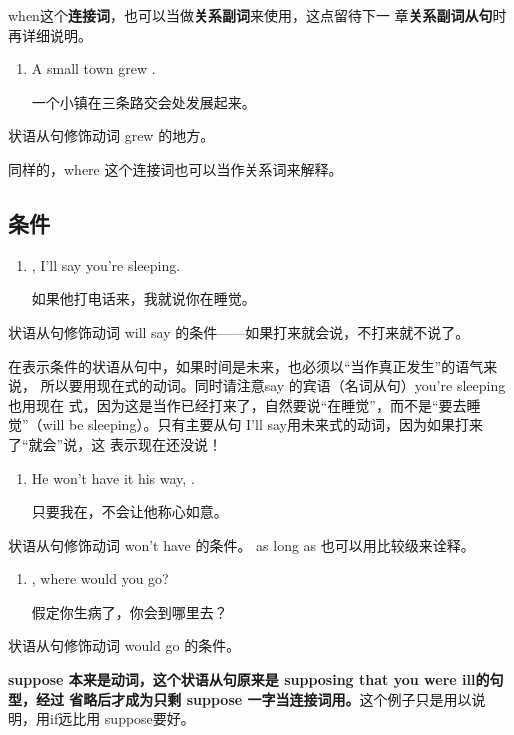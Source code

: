 when这个\textbf{连接词}，也可以当做\textbf{关系副词}来使用，这点留待下一
章\textbf{关系副词从句}时再详细说明。

\begin{enumerate}[resume]
\item A small town grew  .

  一个小镇在三条路交会处发展起来。
\end{enumerate}
状语从句修饰动词 grew 的地方。

同样的，where 这个连接词也可以当作关系词来解释。

\subsection{条件}

\begin{enumerate}
\item {} , I'll say you're
  sleeping.

  如果他打电话来，我就说你在睡觉。
\end{enumerate}
状语从句修饰动词 will say 的条件——如果打来就会说，不打来就不说了。

在表示条件的状语从句中，如果时间是未来，也必须以“当作真正发生”的语气来说，
所以要用现在式的动词。同时请注意say 的宾语（名词从句）you're sleeping也用现在
式，因为这是当作已经打来了，自然要说“在睡觉”，而不是“要去睡觉”（will be
sleeping）。只有主要从句 I'll say用未来式的动词，因为如果打来了“就会”说，这
表示现在还没说！

\begin{enumerate}[resume]
\item He won't have it his way,  .

  只要我在，不会让他称心如意。
\end{enumerate}
状语从句修饰动词 won't have 的条件。 as long as 也可以用比较级来诠释。

\begin{enumerate}[resume]
\item {} , where would you go?

  假定你生病了，你会到哪里去？
\end{enumerate}
状语从句修饰动词 would go 的条件。

\textbf{suppose 本来是动词，这个状语从句原来是 supposing that you were ill的句型，经过
  省略后才成为只剩 suppose 一字当连接词用。}这个例子只是用以说明，用if远比用
suppose要好。

